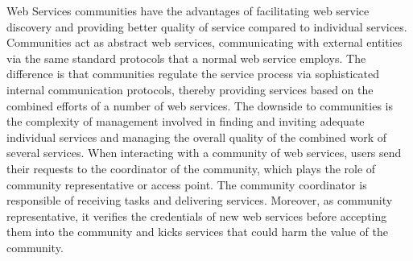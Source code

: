 Web Services communities have the advantages of facilitating web service discovery and providing better quality of service compared to individual services. Communities act as abstract web services, communicating with external entities via the same standard protocols that a normal web service employs. The difference is that communities regulate the service process via sophisticated internal communication protocols, thereby providing services based on the combined efforts of a number of web services. The downside to communities is the complexity of management involved in finding and inviting adequate individual services and managing the overall quality of the combined work of several services.
When interacting with a community of web services, users send their requests to the coordinator of the community, which plays the role of community representative or access point. The community coordinator is responsible of receiving tasks and delivering services. Moreover, as community representative, it verifies the credentials of new web services before accepting them into the community and kicks services that could harm the value of the community.

